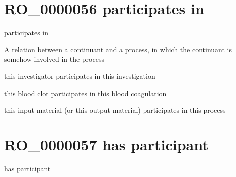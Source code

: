 \documentclass[letterpaper,10pt,english]{sphinxmanual}
\begin{document}
\section{RO\_0000056 \sphinxhyphen{} participates in}
\label{\detokenize{doc-RO_0000056:ro-0000056-participates-in}}\label{\detokenize{doc-RO_0000056:index-0}}\label{\detokenize{doc-RO_0000056::doc}}
\begin{sphinxShadowBox}

\sphinxAtStartPar
participates in
\end{sphinxShadowBox}

\begin{sphinxShadowBox}

\sphinxAtStartPar
A relation between a continuant and a process, in which the continuant is somehow involved in the process
\end{sphinxShadowBox}

\begin{sphinxShadowBox}

\sphinxAtStartPar
this investigator participates in this investigation

\sphinxAtStartPar
this blood clot participates in this blood coagulation

\sphinxAtStartPar
this input material (or this output material) participates in this process
\end{sphinxShadowBox}

\begin{sphinxShadowBox}

\sphinxAtStartPar
{}
\end{sphinxShadowBox}
\begin{quote}
\label{\detokenize{doc-RO_0000057:ro-0000057}}\label{\detokenize{doc-RO_0000057:has-participant}}\label{\detokenize{doc-RO_0000057:ro-0000057}}
\ignorespaces \end{quote}


\section{RO\_0000057 \sphinxhyphen{} has participant}
\label{\detokenize{doc-RO_0000057:ro-0000057-has-participant}}\label{\detokenize{doc-RO_0000057:index-0}}\label{\detokenize{doc-RO_0000057::doc}}
\begin{sphinxShadowBox}

\sphinxAtStartPar
has participant
\end{sphinxShadowBox}
\end{document}
